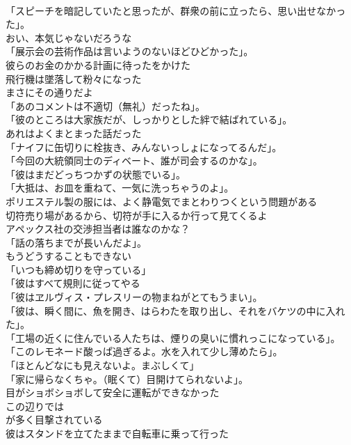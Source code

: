 \documentclass[8pt]{extreport}
\begin{document}
\begin{CJK}{UTF8}{min}
\\	「スピーチを暗記していたと思ったが、群衆の前に立ったら、思い出せなかった」。	
\\	おい、本気じゃないだろうな	
\\	「展示会の芸術作品は言いようのないほどひどかった」。	
\\	彼らのお金のかかる計画に待ったをかけた	
\\	飛行機は墜落して粉々になった	
\\	まさにその通りだよ	
\\	「あのコメントは不適切（無礼）だったね」。	
\\	「彼のところは大家族だが、しっかりとした絆で結ばれている」。	
\\	あれはよくまとまった話だった	
\\	「ナイフに缶切りに栓抜き、みんないっしょになってるんだ」。	
\\	「今回の大統領同士のディベート、誰が司会するのかな」。	
\\	「彼はまだどっちつかずの状態でいる」。	
\\	「大抵は、お皿を重ねて、一気に洗っちゃうのよ」。	
\\	ポリエステル製の服には、よく静電気でまとわりつくという問題がある	
\\	切符売り場があるから、切符が手に入るか行って見てくるよ	
\\	アペックス社の交渉担当者は誰なのかな？	
\\	「話の落ちまでが長いんだよ」。	
\\	もうどうすることもできない	
\\	「いつも締め切りを守っている」	
\\	「彼はすべて規則に従ってやる	
\\	「彼はヱルヴィス・プレスリーの物まねがとてもうまい」。	
\\	「彼は、瞬く間に、魚を開き、はらわたを取り出し、それをバケツの中に入れた」。	
\\	「工場の近くに住んでいる人たちは、煙りの臭いに慣れっこになっている」。	
\\	「このレモネード酸っぱ過ぎるよ。水を入れて少し薄めたら」。	
\\	「ほとんどなにも見えないよ。まぶしくて」	
\\	「家に帰らなくちゃ。（眠くて）目開けてられないよ」。	
\\	目がショボショボして安全に運転ができなかった	
\\	この辺りでは
\\	が多く目撃されている	
\\	彼はスタンドを立てたままで自転車に乗って行った	

\end{CJK}
\end{document}
